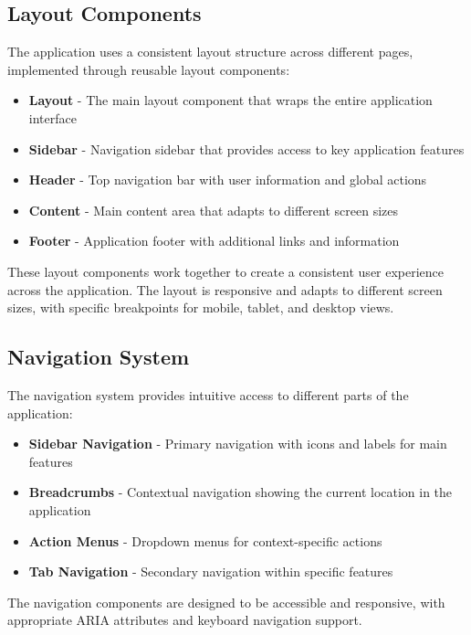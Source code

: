 \subsection{Layout Components}

The application uses a consistent layout structure across different pages, implemented through reusable layout components:

\begin{itemize}
  \item \textbf{Layout} - The main layout component that wraps the entire application interface
  \item \textbf{Sidebar} - Navigation sidebar that provides access to key application features
  \item \textbf{Header} - Top navigation bar with user information and global actions
  \item \textbf{Content} - Main content area that adapts to different screen sizes
  \item \textbf{Footer} - Application footer with additional links and information
\end{itemize}

These layout components work together to create a consistent user experience across the application. The layout is responsive and adapts to different screen sizes, with specific breakpoints for mobile, tablet, and desktop views.

\subsection{Navigation System}

The navigation system provides intuitive access to different parts of the application:

\begin{itemize}
  \item \textbf{Sidebar Navigation} - Primary navigation with icons and labels for main features
  \item \textbf{Breadcrumbs} - Contextual navigation showing the current location in the application
  \item \textbf{Action Menus} - Dropdown menus for context-specific actions
  \item \textbf{Tab Navigation} - Secondary navigation within specific features
\end{itemize}

The navigation components are designed to be accessible and responsive, with appropriate ARIA attributes and keyboard navigation support.

